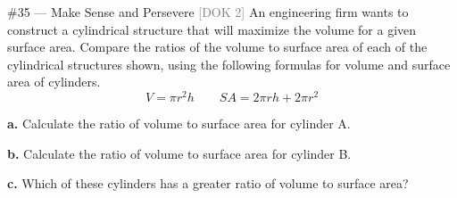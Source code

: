 \documentclass[11pt]{article}
\newcommand{\doktag}[1]{\hfill\textcolor{gray}{\small\textsf{[DOK #1]}}}
\newcommand{\workspace}[1]{\vspace{#1}}
\begin{document}
\begin{problem}{\#35 --- Make Sense and Persevere \doktag{2}}
An engineering firm wants to construct a cylindrical structure that will maximize the volume for a given surface area. Compare the ratios of the volume to surface area of each of the cylindrical structures shown, using the following formulas for volume and surface area of cylinders.
\[
V = \pi r^2 h \qquad SA = 2\pi r h + 2\pi r^2
\]

\begin{center}
\end{center}

\textbf{a.} Calculate the ratio of volume to surface area for cylinder A.
\workspace{4cm}

\textbf{b.} Calculate the ratio of volume to surface area for cylinder B.
\workspace{4cm}

\textbf{c.} Which of these cylinders has a greater ratio of volume to surface area?
\workspace{2.5cm}
\end{problem}

\newpage
\end{document}
